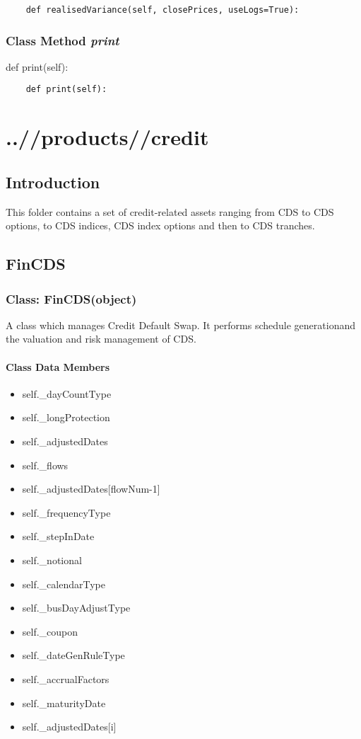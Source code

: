 \documentclass[twoside,11pt]{book}
\begin{document}
\begin{lstlisting}
    def realisedVariance(self, closePrices, useLogs=True):
\end{lstlisting}

\subsection{Class Method {\it print}}
def print(self):

\begin{lstlisting}
    def print(self):
\end{lstlisting}


\chapter{..//products//credit}
\section{Introduction}
This folder contains a set of credit-related assets ranging from CDS to CDS options, to CDS indices, CDS index options and then to CDS tranches. 
\newpage
\section{FinCDS}

\subsection{Class: FinCDS(object)}
A class which manages Credit Default Swap. It performs schedule generationand the valuation and risk management of CDS. 

\subsubsection{Class Data Members}
\begin{itemize}
\item{self.\_dayCountType}
\item{self.\_longProtection}
\item{self.\_adjustedDates}
\item{self.\_flows}
\item{self.\_adjustedDates[flowNum-1]}
\item{self.\_frequencyType}
\item{self.\_stepInDate}
\item{self.\_notional}
\item{self.\_calendarType}
\item{self.\_busDayAdjustType}
\item{self.\_coupon}
\item{self.\_dateGenRuleType}
\item{self.\_accrualFactors}
\item{self.\_maturityDate}
\item{self.\_adjustedDates[i]}
\end{itemize}
\end{document}
